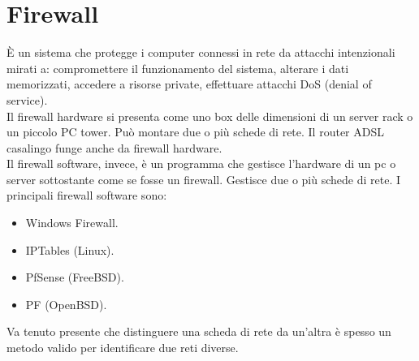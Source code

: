 \documentclass[a4paper]{report}
\begin{document}
\chapter{Firewall}
È un sistema che protegge i computer connessi in rete da attacchi intenzionali mirati a: compromettere il funzionamento del sistema, alterare i dati memorizzati, accedere a risorse private, effettuare attacchi DoS (denial of service).\\
Il firewall hardware si presenta come uno box delle dimensioni di un server rack o un piccolo PC tower. Può montare due o più schede di rete. Il router ADSL casalingo funge anche da firewall hardware.\\
Il firewall software, invece, è un programma che gestisce l'hardware di un pc o server sottostante come se fosse un firewall. Gestisce due o più schede di rete. I principali firewall software sono:
\begin{itemize}
\item Windows Firewall.
\item IPTables (Linux).
\item PfSense (FreeBSD).
\item PF (OpenBSD).
\end{itemize}
Va tenuto presente che distinguere una scheda di rete da un'altra è spesso un metodo valido per identificare due reti diverse.\\
\end{document}
